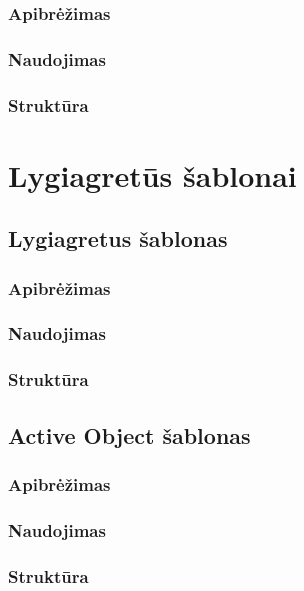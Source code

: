 \documentclass[10pt]{IEEEtran}
\begin{document}
			\subsubsection{Apibrėžimas}

			\subsubsection{Naudojimas}

			\subsubsection{Struktūra}

	\section{Lygiagretūs šablonai}

		\subsection{Lygiagretus šablonas}

			\subsubsection{Apibrėžimas}

			\subsubsection{Naudojimas}

			\subsubsection{Struktūra}

		\subsection{Active Object šablonas}

			\subsubsection{Apibrėžimas}

			\subsubsection{Naudojimas}

			\subsubsection{Struktūra}
\end{document}
